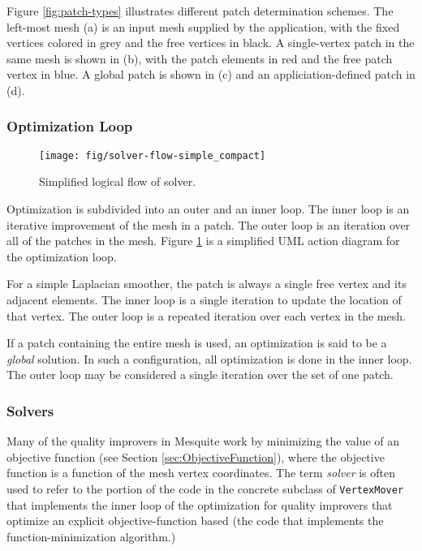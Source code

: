 \documentclass{article}
\begin{document}
Figure \ref{fig:patch-types} illustrates different patch determination schemes.  The left-most mesh (a) is an input mesh supplied by the application, with the fixed vertices colored in grey and the free vertices in black. A single-vertex patch in the same mesh is shown in (b), with the patch elements in red and the free patch vertex in blue.   A global patch is shown in (c) and an appliciation-defined patch in (d).

\subsubsection{Optimization Loop}

\begin{figure}[htb]
\begin{center}
\texttt{[image: fig/solver-flow-simple\_compact]}
\caption{Simplified logical flow of solver.\label{fig:solver-flow}}
\end{center}
\end{figure}

Optimization is subdivided into an outer and an inner loop.  The inner loop is an iterative improvement of the mesh in a patch.  The outer loop is an iteration over all of the patches in the mesh.  Figure \ref{fig:solver-flow} is a simplified UML action diagram for the optimization loop.

For a simple Laplacian smoother, the patch is always a single free vertex and its adjacent elements.  The inner loop is a single iteration to update the location of that vertex.  The outer loop is a repeated iteration over each vertex in the mesh.

If a patch containing the entire mesh is used, an optimization is said to be a \emph{global} solution.  In such a configuration, all optimization is done in the inner loop.  The outer loop may be considered a single iteration over the set of one patch.

\subsubsection{Solvers}

Many of the quality improvers in Mesquite work by minimizing the value of an objective function (see Section \ref{sec:ObjectiveFunction}), where the objective function is a function of the mesh vertex coordinates.   The term \emph{solver} is often used to refer to the portion of the code in the concrete subclass of \texttt{VertexMover} that implements the inner loop of the optimization for quality improvers that optimize an explicit objective-function based (the code that implements the function-minimization algorithm.)
\end{document}
